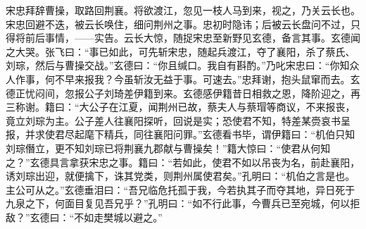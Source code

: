 宋忠拜辞曹操，取路回荆襄。将欲渡江，忽见一枝人马到来，视之，乃关云长也。宋忠回避不迭，被云长唤住，细问荆州之事。忠初时隐讳；后被云长盘问不过，只得将前后事情，——实告。云长大惊，随捉宋忠至新野见玄德，备言其事。玄德闻之大哭。张飞曰：“事已如此，可先斩宋忠，随起兵渡江，夺了襄阳，杀了蔡氏、刘琮，然后与曹操交战。”玄德曰：“你且缄口。我自有斟酌。”乃叱宋忠曰：“你知众人作事，何不早来报我？今虽斩汝无益于事。可速去。”忠拜谢，抱头鼠窜而去。玄德正忧闷间，忽报公子刘琦差伊籍到来。玄德感伊籍昔日相救之恩，降阶迎之，再三称谢。籍曰：“大公子在江夏，闻荆州已故，蔡夫人与蔡瑁等商议，不来报丧，竟立刘琮为主。公子差人往襄阳探听，回说是实；恐使君不知，特差某赍哀书呈报，并求使君尽起麾下精兵，同往襄阳问罪。”玄德看书毕，谓伊籍曰：“机伯只知刘琮僭立，更不知刘琮已将荆襄九郡献与曹操矣！”籍大惊曰：“使君从何知之？”玄德具言拿获宋忠之事。籍曰：“若如此，使君不如以吊丧为名，前赴襄阳，诱刘琮出迎，就便擒下，诛其党类，则荆州属使君矣。”孔明曰：“机伯之言是也。主公可从之。”玄德垂泪曰：“吾兄临危托孤于我，今若执其子而夺其地，异日死于九泉之下，何面目复见吾兄乎？”孔明曰：“如不行此事，今曹兵已至宛城，何以拒敌？”玄德曰：“不如走樊城以避之。”

